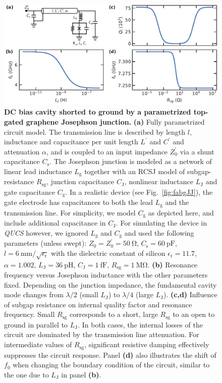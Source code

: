 \begin{figure}[t]
	\centering
	\includegraphics[width=\linewidth]{chapter-introduction/figs/model_DC_bias_cavity_params_RCSJ.pdf}
	\caption{
		\textbf{DC bias cavity shorted to ground by a parametrized top-gated graphene Josephson junction.}
		\textbf{(a)} Fully parametrized circuit model.
		The transmission line is described by length $l$, inductance and capacitance per unit length $L^\prime$ and $C^\prime$ and attenuation $\alpha$, and is coupled to an input impedance $Z_0^\prime$ via a shunt capacitance $C_\text{s}$.
		The Josephson junction is modeled as a network of linear lead inductance $L_\text{g}$ together with an RCSJ model of subgap-resistance $R_\text{sg}$, junction capacitance $C_\text{J}$, nonlinear inductance $L_\text{J}$ and gate capacitance $C_\text{g}$.
		In a realistic device (see Fig.~\ref{fig:fabgJJ}), the gate electrode has capacitances to both the lead $L_\text{g}$ and the transmission line.
		For simplicity, we model $C_\text{g}$ as depicted here, and include additional capacitance in $C_\text{J}$.
		For simulating the device in \textit{QUCS} however, we ignored $L_\text{g}$ and $C_\text{g}$ and used the following parameters (unless swept):
		$Z_0=Z_0^\prime=\SI{50}{\ohm}$, $C_\text{s}=\SI{60}{\pico\farad}$, $l=\SI{6}{\milli\meter}/\sqrt{\epsilon_\text{r}}$ with the dielectric constant of silicon $\epsilon_\text{r}=11.7$, $\alpha=1.002$,  $L_\text{J}=\SI{36}{\pico\henry}$, $C_\text{J}=\SI{1}{\femto\farad}$, $R_\text{sg}=\SI{1}{\mega\ohm}$.
		\textbf{(b)} Resonance frequency versus Josephson inductance with the other parameters fixed.
		Depending on the junction impedance, the fundamental cavity mode changes from $\lambda/2$ (small $L_\text{J}$) to $\lambda/4$ (large $L_\text{J}$).
		\textbf{(c,d)} Influence of subgap resistance on internal quality factor and resonance frequency.
		Small $R_\text{sg}$ corresponds to a short, large $R_\text{sg}$ to an open to ground in parallel to $L_\text{J}$.
		In both cases, the internal losses of the circuit are dominated by the transmission line attenuation.
		For intermediate values of $R_\text{sg}$, significant resistive damping effectively suppresses the circuit response.
		Panel \textbf{(d)} also illustrates the shift of $f_0$ when changing the boundary condition of the circuit, similar to the one due to $L_\text{J}$ in panel \textbf{(b)}.
	}
	\label{fig:TLmodel}
\end{figure}


